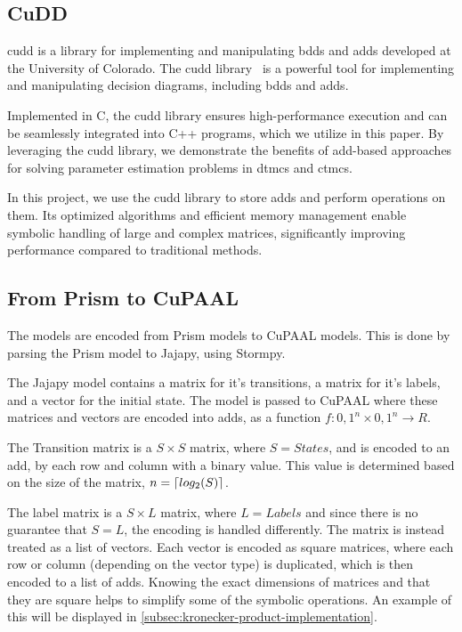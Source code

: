 \subsection{CuDD}\label{subsec:cudd}
\acrfull{cudd} is a library for implementing and manipulating \glspl{bdd} and \glspl{add} developed at the University of Colorado.
The \gls{cudd} library~\cite{somenzi1997cudd} is a powerful tool for implementing and manipulating decision diagrams, including \glspl{bdd} and \glspl{add}.

Implemented in C, the \gls{cudd} library ensures high-performance execution and can be seamlessly integrated into C++ programs, which we utilize in this paper.
By leveraging the \gls{cudd} library, we demonstrate the benefits of \gls{add}-based approaches for solving parameter estimation problems in \glspl{dtmc} and \glspl{ctmc}.

In this project, we use the \gls{cudd} library to store \glspl{add} and perform operations on them.
Its optimized algorithms and efficient memory management enable symbolic handling of large and complex matrices, significantly improving performance compared to traditional methods.



\subsection{From Prism to CuPAAL}\label{subsec:from_prism_to_cupaal}
The models are encoded from Prism models to CuPAAL models. This is done by parsing the Prism model to Jajapy, using Stormpy.

The Jajapy model contains a matrix for it's transitions, a matrix for it's labels, and a vector for the initial state.
The model is passed to CuPAAL where these matrices and vectors are encoded into \glspl{add}, as a function $f \colon {0,1}^n \times {0,1}^n \to R$.

The Transition matrix is a $S\times S$ matrix, where $S=States$, and is encoded to an \gls{add}, by each row and column with a binary value. This value is determined based on the size of the matrix,
$n = \left\lceil log_2(S) \right\rceil$.

The label matrix is a $S\times L$ matrix, where $L=Labels$ and since there is no guarantee that $S = L$, the encoding is handled differently.
The matrix is instead treated as a list of vectors.
Each vector is encoded as square matrices, where each row or column (depending on the vector type) is duplicated, which is then encoded to a list of \glspl{add}.
Knowing the exact dimensions of matrices and that they are square helps to simplify some of the symbolic operations.
An example of this will be displayed in \autoref{subsec:kronecker-product-implementation}.

